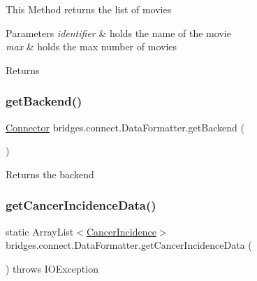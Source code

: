 This Method returns the list of movies 
\begin{DoxyParams}{Parameters}
{\em identifier} & holds the name of the movie \\
\hline
{\em max} & holds the max number of movies \\
\hline
\end{DoxyParams}
\begin{DoxyReturn}{Returns}

\end{DoxyReturn}
\mbox{\label{classbridges_1_1connect_1_1_data_formatter_a29cf4c2b0c5629d63a76b60569355c65}} 
\subsubsection{\texorpdfstring{get\+Backend()}{getBackend()}}
{\footnotesize\ttfamily \hyperlink{classbridges_1_1connect_1_1_connector}{Connector} bridges.\+connect.\+Data\+Formatter.\+get\+Backend (\begin{DoxyParamCaption}{ }\end{DoxyParamCaption})\hspace{0.3cm}{\ttfamily [protected]}}

\begin{DoxyReturn}{Returns}
the backend 
\end{DoxyReturn}
\mbox{\label{classbridges_1_1connect_1_1_data_formatter_af26cb09a93bf326fe14ad8fecf46b4f8}} 
\subsubsection{\texorpdfstring{get\+Cancer\+Incidence\+Data()}{getCancerIncidenceData()}}
{\footnotesize\ttfamily static Array\+List$<$\hyperlink{classbridges_1_1data__src__dependent_1_1_cancer_incidence}{Cancer\+Incidence}$>$ bridges.\+connect.\+Data\+Formatter.\+get\+Cancer\+Incidence\+Data (\begin{DoxyParamCaption}{ }\end{DoxyParamCaption}) throws I\+O\+Exception\hspace{0.3cm}{\ttfamily [static]}}

